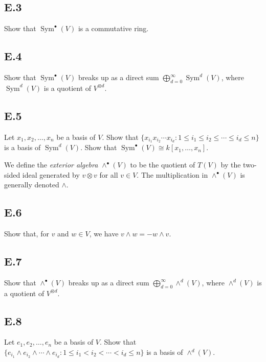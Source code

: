 \documentclass[lang=cn,11pt]{template}
\begin{document}
\subsection*{E.3} Show that \( \operatorname{Sym}^\bullet(V) \) is a commutative ring.

\subsection*{E.4} Show that \( \operatorname{Sym}^\bullet(V) \) breaks up as a direct sum \( \bigoplus_{d=0}^{\infty} \operatorname{Sym}^d(V) \), where \( \operatorname{Sym}^d(V) \) is a quotient of \( V^{\otimes d} \).

\subsection*{E.5} Let \( x_1, x_2, \dots, x_n \) be a basis of \( V \). Show that \( \{ x_{i_1} x_{i_2} \cdots x_{i_d} : 1 \leq i_1 \leq i_2 \leq \cdots \leq i_d \leq n \} \) is a basis of \( \operatorname{Sym}^d(V) \). Show that \( \operatorname{Sym}^\bullet(V) \cong k[x_1, \dots, x_n] \).

\begin{definition}
We define the \textit{exterior algebra} \( \wedge^\bullet(V) \) to be the quotient of \( T(V) \) by the two-sided ideal generated by \( v \otimes v \) for all \( v \in V \). The multiplication in \( \wedge^\bullet(V) \) is generally denoted \( \wedge \).
\end{definition}

\subsection*{E.6} Show that, for \( v \) and \( w \in V \), we have \( v \wedge w = -w \wedge v \).

\subsection*{E.7} Show that \( \wedge^\bullet(V) \) breaks up as a direct sum \( \bigoplus_{d=0}^{\infty} \wedge^d(V) \), where \( \wedge^d(V) \) is a quotient of \( V^{\otimes d} \).

\subsection*{E.8} Let \( e_1, e_2, \dots, e_n \) be a basis of \( V \). Show that \( \{ e_{i_1} \wedge e_{i_2} \wedge \cdots \wedge e_{i_d} : 1 \leq i_1 < i_2 < \cdots < i_d \leq n \} \) is a basis of \( \wedge^d(V) \).
\end{document}
